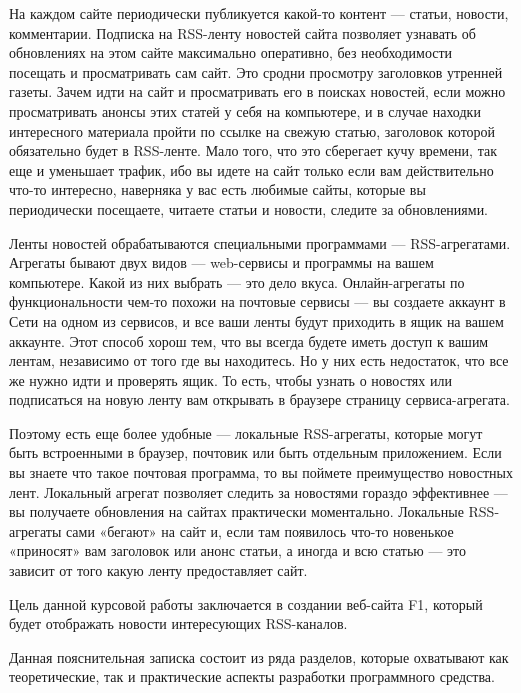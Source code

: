\documentclass[14pt,a4paper]{extreport}
\begin{document}
\hspace{4ex}На каждом сайте периодически публикуется какой-то контент — статьи, новости, комментарии. Подписка на RSS-ленту новостей сайта позволяет узнавать об обновлениях на этом сайте максимально оперативно, без необходимости посещать и просматривать сам сайт. Это сродни просмотру заголовков утренней газеты. Зачем идти на сайт и просматривать его в поисках новостей, если можно просматривать анонсы этих статей у себя на компьютере, и в случае находки интересного материала пройти по ссылке на свежую статью, заголовок которой обязательно будет в RSS-ленте.  Мало того, что это сберегает кучу времени, так еще и уменьшает трафик, ибо вы идете на сайт только если вам действительно что-то интересно, наверняка у вас есть любимые сайты, которые вы периодически посещаете, читаете статьи и новости, следите за обновлениями.

\hspace{4ex}Ленты новостей обрабатываются специальными программами — RSS-агрегатами.  Агрегаты бывают двух видов — web-сервисы и программы на вашем компьютере. Какой из них выбрать — это дело вкуса. Онлайн-агрегаты по функциональности чем-то похожи на почтовые сервисы — вы создаете аккаунт в Сети на одном из сервисов, и все ваши ленты будут приходить в ящик на вашем аккаунте. Этот способ хорош тем, что вы всегда будете иметь доступ к вашим лентам, независимо от того где вы находитесь. Но у них есть недостаток, что все же нужно идти и проверять ящик. То есть, чтобы узнать о новостях или подписаться на новую ленту вам открывать в браузере страницу сервиса-агрегата.

\hspace{4ex}Поэтому есть еще более удобные — локальные RSS-агрегаты, которые могут быть встроенными в браузер, почтовик или быть отдельным приложением.  Если вы знаете что такое почтовая программа, то вы поймете преимущество новостных лент. Локальный агрегат позволяет следить за новостями гораздо эффективнее — вы получаете обновления на сайтах практически моментально. Локальные RSS-агрегаты сами «бегают» на сайт и, если там появилось что-то новенькое «приносят» вам заголовок или анонс статьи, а иногда и всю статью — это зависит от того какую ленту предоставляет сайт.

\hspace{4ex}Цель данной курсовой работы заключается в создании веб-сайта F1, который будет отображать новости интересующих RSS-каналов. 

\hspace{4ex}Данная пояснительная записка состоит из ряда разделов, которые охватывают как теоретические, так и практические аспекты разработки программного средства. 
\
\end{document}
